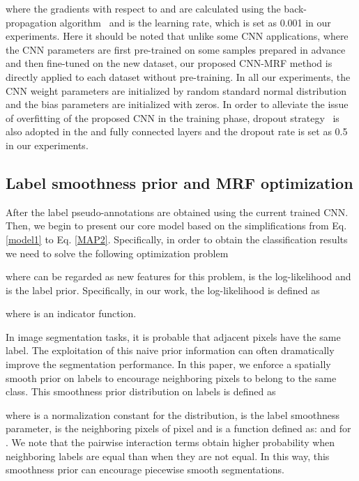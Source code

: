 \documentclass[journal]{IEEEtran}
\begin{document}
	where the gradients with respect to  and  are calculated using the back-propagation algorithm~\cite{rumelhart1985learning} and  is the learning rate, which is set as 0.001 in our experiments. {{Here it should be noted that unlike some CNN applications, where the CNN parameters are first pre-trained on some samples prepared in advance and then fine-tuned on the new dataset, our proposed CNN-MRF method is directly applied to each dataset without pre-training. In all our experiments, the CNN weight parameters  are initialized by random standard normal distribution and the bias parameters  are initialized with zeros.}} In order to alleviate the issue of overfitting of the proposed CNN in the training phase, dropout strategy~\cite{srivastava2014dropout} is also adopted in the  and  fully connected layers and the dropout rate is set as 0.5 in our experiments.
	
	\subsection{Label smoothness prior and MRF optimization}
	After the label {{pseudo-annotations  are obtained using the current trained CNN. Then, we begin to present our core model based on the simplifications from Eq. \ref{model1} to Eq. \ref{MAP2}.  Specifically, in order to obtain the classification results }} we need to solve the following optimization problem
	
	where  can be regarded as new features for this problem,  is the log-likelihood and  is the label prior. Specifically, in our work, the log-likelihood  is defined as
	
	where  is an indicator function. 
	
	In image segmentation tasks, it is probable that adjacent pixels have the same label. The exploitation of this naive prior information can often dramatically improve the segmentation performance. In this paper, we enforce a spatially smooth prior on labels  to encourage neighboring pixels to belong to the same class. This smoothness prior distribution on labels  is defined as  
	 
	where  is a normalization constant for the distribution,  is the label smoothness parameter,  is the neighboring pixels of pixel  and  is a function defined as:  and  for . We note that the pairwise interaction terms  obtain higher probability when neighboring labels are equal than when they are not equal. In this way, this smoothness prior can encourage piecewise smooth segmentations.
	
\end{document}
